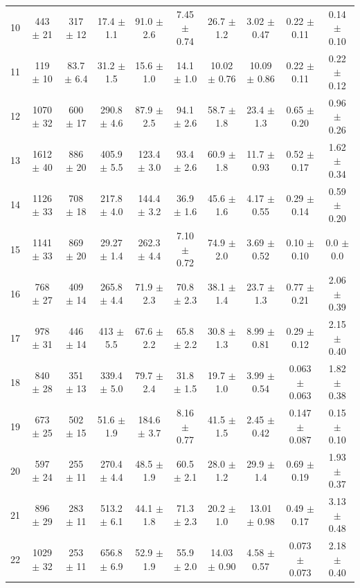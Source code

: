 \begin{table}[]
\begin{adjustwidth}{-2.0cm}{-1.5cm}
\begin{tabular}{c|cc|ccccccc}
10 & 443 $\pm$ 21 & 317 $\pm$ 12 & 17.4 $\pm$ 1.1 & 91.0 $\pm$ 2.6 & 7.45 $\pm$ 0.74 & 26.7 $\pm$ 1.2 & 3.02 $\pm$ 0.47 & 0.22 $\pm$ 0.11 & 0.14 $\pm$ 0.10 \\ 
11 & 119 $\pm$ 10 & 83.7 $\pm$ 6.4 & 31.2 $\pm$ 1.5 & 15.6 $\pm$ 1.0 & 14.1 $\pm$ 1.0 & 10.02 $\pm$ 0.76 & 10.09 $\pm$ 0.86 & 0.22 $\pm$ 0.11 & 0.22 $\pm$ 0.12 \\ 
12 & 1070 $\pm$ 32 & 600 $\pm$ 17 & 290.8 $\pm$ 4.6 & 87.9 $\pm$ 2.5 & 94.1 $\pm$ 2.6 & 58.7 $\pm$ 1.8 & 23.4 $\pm$ 1.3 & 0.65 $\pm$ 0.20 & 0.96 $\pm$ 0.26 \\ 
13 & 1612 $\pm$ 40 & 886 $\pm$ 20 & 405.9 $\pm$ 5.5 & 123.4 $\pm$ 3.0 & 93.4 $\pm$ 2.6 & 60.9 $\pm$ 1.8 & 11.7 $\pm$ 0.93 & 0.52 $\pm$ 0.17 & 1.62 $\pm$ 0.34 \\ 
14 & 1126 $\pm$ 33 & 708 $\pm$ 18 & 217.8 $\pm$ 4.0 & 144.4 $\pm$ 3.2 & 36.9 $\pm$ 1.6 & 45.6 $\pm$ 1.6 & 4.17 $\pm$ 0.55 & 0.29 $\pm$ 0.14 & 0.59 $\pm$ 0.20 \\ 
15 & 1141 $\pm$ 33 & 869 $\pm$ 20 & 29.27 $\pm$ 1.4 & 262.3 $\pm$ 4.4 & 7.10 $\pm$ 0.72 & 74.9 $\pm$ 2.0 & 3.69 $\pm$ 0.52 & 0.10 $\pm$ 0.10 & 0.0 $\pm$ 0.0 \\ 
16 & 768 $\pm$ 27 & 409 $\pm$ 14 & 265.8 $\pm$ 4.4 & 71.9 $\pm$ 2.3 & 70.8 $\pm$ 2.3 & 38.1 $\pm$ 1.4 & 23.7 $\pm$ 1.3 & 0.77 $\pm$ 0.21 & 2.06 $\pm$ 0.39 \\ 
17 & 978 $\pm$ 31 & 446 $\pm$ 14 & 413 $\pm$ 5.5 & 67.6 $\pm$ 2.2 & 65.8 $\pm$ 2.2 & 30.8 $\pm$ 1.3 & 8.99 $\pm$ 0.81 & 0.29 $\pm$ 0.12 & 2.15 $\pm$ 0.40 \\ 
18 & 840 $\pm$ 28 & 351 $\pm$ 13 & 339.4 $\pm$ 5.0 & 79.7 $\pm$ 2.4 & 31.8 $\pm$ 1.5 & 19.7 $\pm$ 1.0 & 3.99 $\pm$ 0.54 & 0.063 $\pm$ 0.063 & 1.82 $\pm$ 0.38 \\ 
19 & 673 $\pm$ 25 & 502 $\pm$ 15 & 51.6 $\pm$ 1.9 & 184.6 $\pm$ 3.7 & 8.16 $\pm$ 0.77 & 41.5 $\pm$ 1.5 & 2.45 $\pm$ 0.42 & 0.147 $\pm$ 0.087 & 0.15 $\pm$ 0.10 \\ 
20 & 597 $\pm$ 24 & 255 $\pm$ 11 & 270.4 $\pm$ 4.4 & 48.5 $\pm$ 1.9 & 60.5 $\pm$ 2.1 & 28.0 $\pm$ 1.2 & 29.9 $\pm$ 1.4 & 0.69 $\pm$ 0.19 & 1.93 $\pm$ 0.37 \\ 
21 & 896 $\pm$ 29 & 283 $\pm$ 11 & 513.2 $\pm$ 6.1 & 44.1 $\pm$ 1.8 & 71.3 $\pm$ 2.3 & 20.2 $\pm$ 1.0 & 13.01 $\pm$ 0.98 & 0.49 $\pm$ 0.17 & 3.13 $\pm$ 0.48 \\ 
22 & 1029 $\pm$ 32 & 253 $\pm$ 11 & 656.8 $\pm$ 6.9 & 52.9 $\pm$ 1.9 & 55.9 $\pm$ 2.0 & 14.03 $\pm$ 0.90 & 4.58 $\pm$ 0.57 & 0.073 $\pm$ 0.073 & 2.18 $\pm$ 0.40 \\ 

\end{tabular}
\end{adjustwidth}
\end{table}

